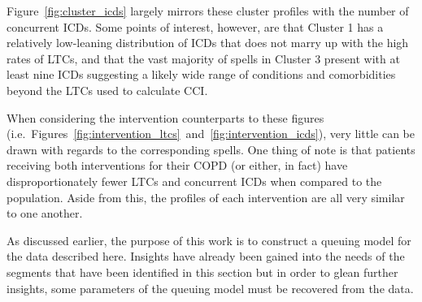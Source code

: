 Figure~\ref{fig:cluster_icds} largely mirrors these cluster profiles with the
number of concurrent ICDs. Some points of interest, however, are that Cluster 1
has a relatively low-leaning distribution of ICDs that does not marry up with
the high rates of LTCs, and that the vast majority of spells in Cluster 3
present with at least nine ICDs suggesting a likely wide range of conditions and
comorbidities beyond the LTCs used to calculate CCI.\

When considering the intervention counterparts to these figures (i.e.\
Figures~\ref{fig:intervention_ltcs}~and~\ref{fig:intervention_icds}), very
little can be drawn with regards to the corresponding spells. One thing of note
is that patients receiving both interventions for their COPD (or either, in
fact) have disproportionately fewer LTCs and concurrent ICDs when compared to
the population. Aside from this, the profiles of each intervention are all very
similar to one another.

As discussed earlier, the purpose of this work is to construct a queuing model
for the data described here. Insights have already been gained into the needs of
the segments that have been identified in this section but in order to glean
further insights, some parameters of the queuing model must be recovered from
the data.
